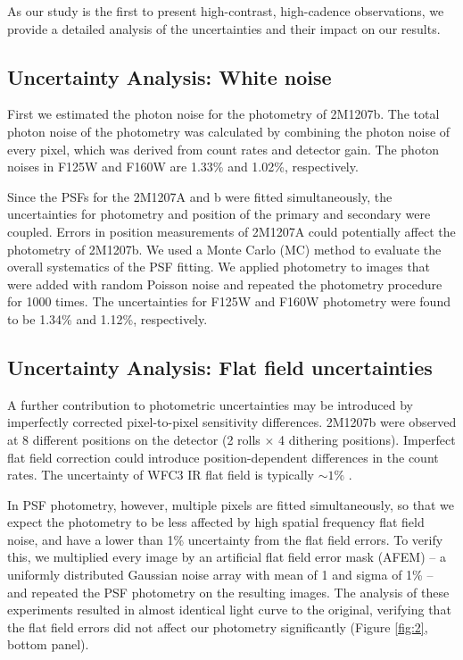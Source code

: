 \documentclass[apj]{emulateapj}
\begin{document}
As our study is the first to present high-contrast, high-cadence
observations, we provide a detailed analysis of the uncertainties and
their impact on our results.

\subsection{Uncertainty Analysis: White noise}

First we estimated the photon noise for the photometry of
2M1207b. The total photon noise of the photometry was calculated by
combining the photon noise of every pixel, which was derived
from count rates and detector gain. The photon noises 
in F125W and F160W are 1.33\% and 1.02\%, respectively.

Since the PSFs for the 2M1207A and b were fitted simultaneously, the
uncertainties for photometry and position of the primary and secondary
were coupled. Errors in position measurements of 2M1207A could
potentially affect the photometry of 2M1207b. We used a Monte Carlo
(MC) method to evaluate the overall systematics of the PSF fitting. We
applied photometry to images that were added with random
Poisson noise and repeated the photometry procedure for 1000 times. The
uncertainties for F125W and F160W photometry were found to be 1.34\% and 1.12\%,
respectively. 

\subsection{Uncertainty Analysis: Flat field uncertainties}


A further contribution to photometric uncertainties may be introduced
by imperfectly corrected pixel-to-pixel sensitivity
differences. 2M1207b were observed at 8 different positions on the
detector (2 rolls $\times$ 4 dithering positions). Imperfect flat
field correction could introduce position-dependent
differences in the count rates. The uncertainty of WFC3 IR flat field
is typically $\sim 1\%$ \citep{dressel2012wide}.

In PSF photometry, however, multiple pixels are fitted simultaneously,
so that we expect the photometry to be less affected by high spatial frequency flat field
noise, and have a lower than 1\% uncertainty from the flat field
errors. To verify this, we multiplied every image by an artificial flat
field error mask (AFEM) -- a uniformly distributed Gaussian noise array with
mean of 1 and sigma of 1\% -- and repeated the PSF photometry on the
resulting images.  The analysis of these experiments resulted in almost
identical light curve to the original, verifying that the flat field
errors did not affect our photometry significantly (Figure
\ref{fig:2}, bottom panel).
\end{document}
